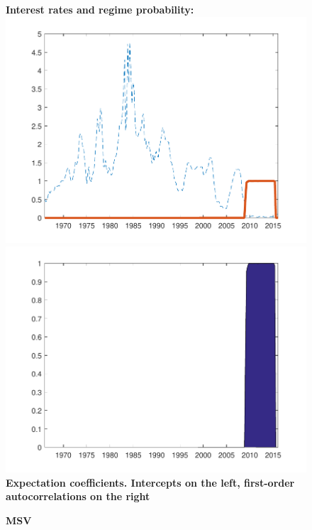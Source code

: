 \documentclass[12pt,reqno]{article}
\numberwithin{equation}{section}
\begin{document}
\begin{figure}[H]
\caption{\large{\textbf{MSV}}}
\vspace{5 mm}

\textbf{Interest rates and regime probability:} \\

\includegraphics[scale=0.6]{NKPC_optim_init_MSV_regime.pdf}
\includegraphics[scale=0.6]{NKPC_optim_init_MSV_regimeProb.pdf}\\

\textbf{Expectation coefficients. Intercepts on the left, first-order autocorrelations on the right}\\


\end{figure}
\end{document}
